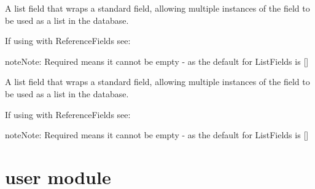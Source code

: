 \documentclass[letterpaper,10pt,english]{sphinxmanual}
\begin{document}
\begin{fulllineitems}

\begin{fulllineitems}
\label{\detokenize{test_item:test_item.TestItem.response_model}}
A list field that wraps a standard field, allowing multiple instances
of the field to be used as a list in the database.

If using with ReferenceFields see: 

\begin{sphinxadmonition}{note}{Note:}
Required means it cannot be empty - as the default for ListFields is {[}{]}
\end{sphinxadmonition}

\end{fulllineitems}


\begin{fulllineitems}
\label{\detokenize{test_item:test_item.TestItem.source}}
A list field that wraps a standard field, allowing multiple instances
of the field to be used as a list in the database.

If using with ReferenceFields see: 

\begin{sphinxadmonition}{note}{Note:}
Required means it cannot be empty - as the default for ListFields is {[}{]}
\end{sphinxadmonition}

\end{fulllineitems}


\end{fulllineitems}



\chapter{user module}
\label{\detokenize{user:module-user}}\label{\detokenize{user:user-module}}\label{\detokenize{user::doc}}
\end{document}

